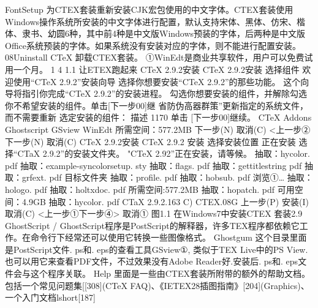 \documentclass[UTF8]{ctexart}
\begin{document}
FontSetup
为CTEX套装重新安装CJK宏包使用的中文字体。CTEX套装使用Windows操作系统所安装的中文字体进行配置，默认支持宋体、黑体、仿宋、楷体、隶书、幼圆6种，其中前4种是中文版Windows预装的字体，后两种是中文版Office系统预装的字体。如果系统没有安装对应的字体，则不能进行配置安装。
08Uninstall CTeX
卸载CTEX套装。
①WinEdt是商业共享软件，用户可以免费试用一个月。
1
4	1.1	让ETEX跑起来
CTeX 2.9.2安装
CTeX 2.9.2安装
选择组件
欢迎使用“CTeX 2.9.2”安装向导
选择你想要安装“CTeX 2.9.2”的那些功能。
这个向导将指引你完成“CTeX 2.9.2”的安装进程。
勾选你想要安装的组件，并解除勾选你不希望安装的组件。单击[下一步00]继
省防伪高器群策”更新指定的系统文件，而不需要重新
选定安装的组件：
描述
1170
单击 [下一步00]继续。
CTeX Addons
Ghostscript
GSview
WinEdt
所需空间：577.2MB
下一步(N)
取消(C)
<上一步②
下一步(N)
取消(C)
CTeX 2.9.2安装
CTeX 2.9.2 安装
选择安装位置
正在安装
选择“CTaX 2.9.2”的安装文件夹。
"CTeX 2.92”正在安装，请等候。
抽取：hycolor. pdf
抽取：example-syncolorsetup. sty
抽取：flags. pdf
抽取：gettitlestring pdf
抽取：grfext. pdf
目标文件夹
抽取：profile. pdf
抽取：hobsub. pdf
浏览①…
抽取：hologo. pdf
抽取：holtxdoc. pdf
所需空间:577.2MB
抽取：hopatch. pdf
可用空间：4.9GB
抽取：hycolor. pdf
CTaX 2.9.2.163 C) CTEX.08G
上一步(P)
安装(I)
取消(C)
<上一步①下一步④>
取消①
图1.1 在Windows7中安装CTEX 套装2.9
GhostScript
/
GhostScript程序是PostScript的解释器，许多TEX程序都依赖它工作。在命令行下经常还可以使用它转换一些图像格式。
Ghostgum
这个目录里面是PostScript文件. ps和. eps的查看工具GSview①, 类似于TEX Live中的PS View.也可以用它来查看PDF文件，不过效果没有Adobe Reader好.安装后. ps和. eps文件会与这个程序关联。
Help
里面是一些由CTEX套装所附带的额外的帮助文档。包括一个常见问题集[[308](CTeX FAQ)、《IETEX28插图指南》[204](Graphics)、一个入门文档lshort[187]
\end{document}
